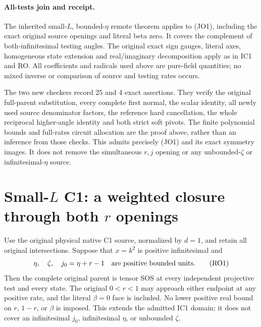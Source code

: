 \paragraph{All-tests join and receipt.}
The inherited small-$L$, bounded-$\eta$ remote theorem applies to
(JO1), including the exact original source openings and literal beta
zero. It covers the complement of both-infinitesimal testing angles.
The original exact sign gauges, literal axes, homogeneous state
extension and real/imaginary decomposition apply as in IC1 and RO.
All coefficients and radicals used above are pure-field quantities;
no mixed inverse or comparison of source and testing rates occurs.

The two new checkers record 25 and 4 exact assertions. They verify
the original full-parent substitution, every complete first normal,
the scalar identity, all newly used source denominator factors,
the reference hard cancellation, the whole reciprocal higher-angle
identity and both strict soft pivots. The finite polynomial bounds
and full-rates circuit allocation are the proof above, rather than
an inference from those checks. This admits precisely (JO1) and its
exact symmetry images. It does not remove the simultaneous
$r,j$ opening or any unbounded-$\zeta$ or infinitesimal-$\eta$ source.


\section{\texorpdfstring{Small-$L$ C1: a weighted closure through both $r$ openings}{Small-L C1: a weighted closure through both r openings}}
\label{component:p3df6e6bdd8f4}

\label{p3df6e6bdd8f4:sec:r13-c1-r-openings}

\begin{theorem}
Use the original physical native C1 source, normalized by $d=1$, and
retain all original intersections. Suppose that $x=k^2$ is positive
infinitesimal and
\[
 \eta,\quad\zeta,\quad j_0=\eta+r-1
       \quad\hbox{are positive bounded units}.                 \tag{RO1}
\]
Then the complete original parent is tensor SOS at every independent
projective test and every state. The original $0<r<1$ may approach
either endpoint at any positive rate, and the literal $\beta=0$ face
is included. No lower positive real bound on $r$, $1-r$, or $\beta$
is imposed. This extends the admitted IC1 domain; it does
not cover an infinitesimal $j_0$, infinitesimal $\eta$, or unbounded
$\zeta$.
\end{theorem}

